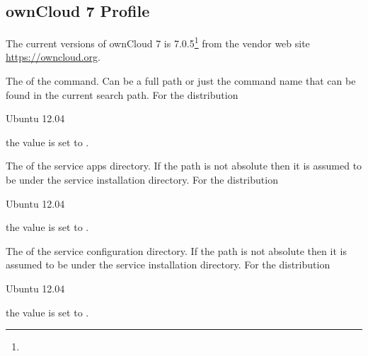 \label{sec:owncloud_7_profile}
\subsection{ownCloud 7 Profile}

The current versions of ownCloud 7 is 
7.0.5\footnote{} from the vendor web site
\url{https://owncloud.org}.


The  of the  command.
Can be a full path or just the command name that can be found in the current search path. 
For the distribution
\begin{inparaitem}
\item[\TheDistribution{ubuntu}] Ubuntu 12.04
\end{inparaitem}
the value is set to .


The  of the service apps directory. If the path is not absolute
then it is assumed to be under the service installation directory.
For the distribution
\begin{inparaitem}
\item[\TheDistribution{ubuntu}] Ubuntu 12.04
\end{inparaitem}
the value is set to .


The  of the service configuration directory. If the path is
not absolute then it is assumed to be under the service installation
directory.
For the distribution
\begin{inparaitem}
\item[\TheDistribution{ubuntu}] Ubuntu 12.04
\end{inparaitem}
the value is set to .

